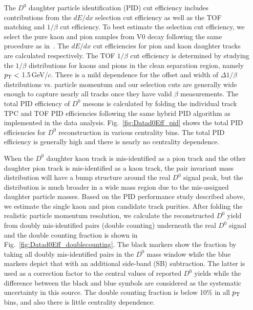 \documentclass[%
 reprint,	
 amsmath,amssymb,
 aps,
 prc,
]{revtex4-1}
\begin{document}
The $D^0$ daughter particle identification (PID) cut efficiency includes contributions from the $dE/dx$ selection cut efficiency as well as the TOF matching and $1/\beta$ cut efficiency. To best estimate the selection cut efficiency, we select the pure kaon and pion samples from V0 decay following the same procedure as in~\cite{Shao:2005iu,Xu:2008th}. The $dE/dx$ cut efficiencies for pion and kaon daughter tracks are calculated respectively. The TOF $1/\beta$ cut efficiency is determined by studying the $1/\beta$ distributions for kaons and pions in the clean separation region, namely $p_{\rm T}<$ 1.5\,GeV/$c$. There is a mild dependence for the offset and width of $\Delta 1/\beta$ distributions vs. particle momentum and our selection cuts are generally wide enough to capture nearly all tracks once they have valid $\beta$ measurements. The total PID efficiency of $D^0$ mesons is calculated by folding the individual track TPC and TOF PID efficiencies following the same hybrid PID algorithm as implemented in the data analysis. Fig.~\ref{fig:Datad0Eff_pid} shows the total PID efficiencies for $D^0$ reconstruction in various centrality bins. The total PID efficiency is generally high and there is nearly no centrality dependence.

When the $D^0$ daughter kaon track is mis-identified as a pion track and the other daughter pion track is mis-identified as a kaon track, the pair invariant mass distribution will have a bump structure around the real $D^0$ signal peak, but the distribution is much broader in a wide mass region due to the mis-assigned daughter particle masses. Based on the PID  performance study described above, we estimate the single kaon and pion candidate track purities. After folding the realistic particle momentum resolution, we calculate the reconstructed $D^0$ yield from doubly mis-identified pairs (double counting) underneath the real $D^0$ signal and the double counting fraction is shown in Fig.~\ref{fig:Datad0Eff_doublecounting}. The black markers show the fraction by taking all doubly mis-identified pairs in the $D^0$ mass window while the blue markers depict that with an additional side-band (SB) subtraction. The latter is used as a correction factor to the central values of reported $D^0$ yields while the difference between the black and blue symbols are considered as the systematic uncertainty in this source. The double counting fraction is below 10\% in all $p_{\rm T}$ bins, and also there is little centrality dependence.
\end{document}
